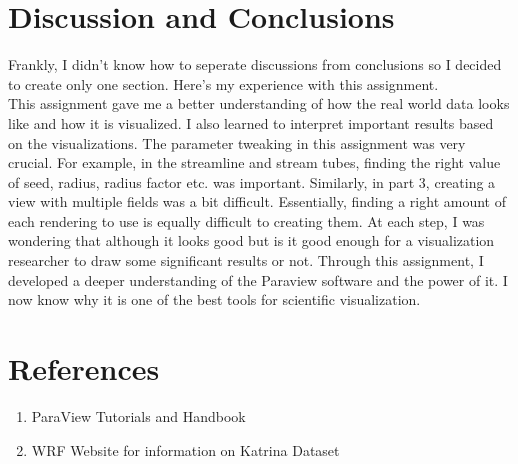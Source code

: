 \documentclass[a4paper,11pt]{article}
\theoremstyle{mytheor}
\begin{document}
\clearpage
\section{Discussion and Conclusions}
Frankly, I didn't know how to seperate discussions from conclusions so I decided to create only one section. Here's my experience with this assignment. \\
This assignment gave me a better understanding of how the real world data looks like and how it is visualized. I also learned to interpret important results based on the visualizations. The parameter tweaking in this assignment was very crucial. For example, in the streamline and stream tubes, finding the right value of seed, radius, radius factor etc. was important. Similarly, in part 3, creating a view with multiple fields was a bit difficult. Essentially, finding a right amount of each rendering to use is equally difficult to creating them. At each step, I was wondering that although it looks good but is it good enough for a visualization researcher to draw some significant results or not. Through this assignment, I developed a deeper understanding of the Paraview software and the power of it. I now know why it is one of the best tools for scientific visualization.  
\section{References}
\begin{enumerate}
    \item ParaView Tutorials and Handbook
    \item WRF Website for information on Katrina Dataset
\end{enumerate}
\end{document}

